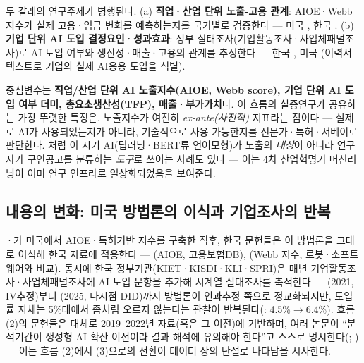 \documentclass[11pt]{article}
\begin{document}
두 갈래의 연구주제가 병행된다. (a) \textbf{직업·산업 단위 노출-고용 관계}: AIOE·Webb 지수가 실제 고용·임금 변화를 예측하는지를 국가별로 검증한다 — 미국 \parencite{acemoglu-2022-artificial-intelligence-and-jobs-evidence}, 한국 \parencite{cheon-2022-ai-employment-wage-effects,han-2023-ai-and-labor-market-change,kiet-2025-ai-occupational-employment-effect,kim-2025-youth-job-choice-ai-exposure}. (b) \textbf{기업 단위 AI 도입 결정요인·성과효과}: 정부 실태조사(기업활동조사·사업체패널조사)로 AI 도입 여부와 생산성·매출·고용의 관계를 추정한다 — 한국 \parencite{kim-2021-ai-adoption-status-major-industries,kiet-2024-ai-adoption-firms-policy,kiet-2024-ai-labor-market-industry,kim-2025-ai-adoption-firm-performance,lee-2025-ai-adoption-determinants-performance,spri-2024-ai-industry-survey}, 미국 \parencite{hampole-2025-artificial-intelligence-and-the-labor}(이력서 텍스트로 기업의 실제 AI응용 도입을 식별).

중심변수는 \textbf{직업/산업 단위 AI 노출지수(AIOE, Webb score), 기업 단위 AI 도입 여부 더미, 총요소생산성(TFP), 매출·부가가치}다. 이 흐름의 실증연구가 공유하는 가장 뚜렷한 특징은, 노출지수가 여전히 \emph{ex-ante(사전적)} 지표라는 점이다 — 실제로 AI가 사용되었는지가 아니라, 기술적으로 사용 가능한지를 전문가·특허·서베이로 판단한다. \textcite{chang-2022-deep-learning-job-classification-system}처럼 이 시기 AI(딥러닝·BERT류 언어모형)가 노출의 \emph{대상}이 아니라 연구자가 구인공고를 분류하는 \emph{도구}로 쓰이는 사례도 있다 — 이는 4차 산업혁명기 머신러닝이 이미 연구 인프라로 일상화되었음을 보여준다.

\subsection{내용의 변화: 미국 방법론의 이식과 기업조사의 반복}

\textcite{felten-2021-occupational-industry-and-geographic-exposure}·\textcite{webb-2020-impact-artificial-intelligence-labor}가 미국에서 AIOE·특허기반 지수를 구축한 직후, 한국 문헌들은 이 방법론을 그대로 이식해 한국 자료에 적용한다 — \textcite{cheon-2022-ai-employment-wage-effects}(AIOE, 고용보험DB), \textcite{han-2023-ai-and-labor-market-change}(Webb 지수, 로봇·소프트웨어와 비교). 동시에 한국 정부기관(KIET·KISDI·KLI·SPRI)은 매년 기업활동조사·사업체패널조사에 AI 도입 문항을 추가해 시계열 실태조사를 축적한다 — \textcite{kiet-2021-ai-adoption-productivity}(2021, IV추정)부터 \textcite{lee-2025-ai-adoption-determinants-performance}(2025, 다시점 DID)까지 방법론이 인과추정 쪽으로 정교화되지만, 도입률 자체는 5\%대에서 좀처럼 오르지 않는다는 관찰이 반복된다(\cite{spri-2024-ai-industry-survey}: 4.5\%$\to$6.4\%). 흐름 (2)의 문헌들은 대체로 2019~2022년 자료(혹은 그 이전)에 기반하며, 여러 논문이 ``분석기간이 생성형 AI 확산 이전이라 결과 해석에 유의해야 한다''고 스스로 명시한다(\cite{kiet-2025-ai-occupational-employment-effect}; \cite{hampole-2025-artificial-intelligence-and-the-labor}) — 이는 흐름 (2)에서 (3)으로의 전환이 데이터 상의 단절로 나타남을 시사한다.
\end{document}
